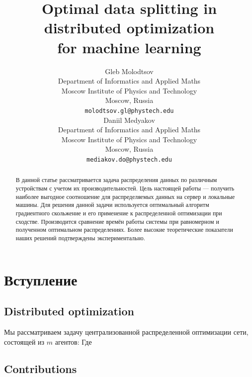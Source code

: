 \documentclass{article}
\title{Optimal data splitting in distributed optimization \\for machine learning}
\author{Gleb Molodtsov
    \\
	Department of Informatics and Applied Maths \\
	Moscow Institute of Physics and Technology\\
	Moscow, Russia\\
	\texttt{molodtsov.gl@phystech.edu} \\
	\And
	Daniil Medyakov \\
	Department of Informatics and Applied Maths \\
	Moscow Institute of Physics and Technology\\
	Moscow, Russia \\
	\texttt{mediakov.do@phystech.edu} \\
}
\begin{document}
\maketitle




\begin{abstract}
В данной статье рассматривается задача распределения данных по различным устройствам с учетом их производительностей. Цель настоящей работы --- получить наиболее выгодное соотношение для распределяемых данных на сервер и локальные машины. Для решения данной задачи используется оптимальный алгоритм градиентного скольжение и его применение к распределенной оптимизации при сходстве. Производится сравнение времён работы системы при равномерном и полученном оптимальном распределениях. Более высокие теоретические показатели наших решений подтверждены экспериментально.
\end{abstract}

\section{Вступление}

\subsection{Distributed optimization}
Мы рассматриваем задачу централизованной распределенной оптимизации сети, состоящей из  $m$ агентов:
Где
\subsection{Contributions}
\end{document}
